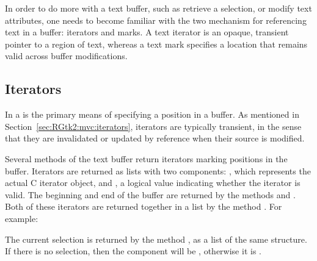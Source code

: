 In order to do more with a text buffer, such as retrieve a selection,
or modify text attributes, one needs to become familiar with the two
mechanism for referencing text in a buffer: iterators and marks.  A
text iterator is an opaque, transient pointer to a region of text,
whereas a text mark specifies a location that remains valid across
buffer modifications.

\subsection{Iterators}


In \GTK{} a  is the primary means of specifying a
position in a buffer.  As mentioned in
Section~\ref{sec:RGtk2:mvc:iterators}, iterators are typically
transient, in the sense that they are invalidated or updated by
reference when their source is modified.

Several methods of the text buffer return iterators marking positions
in the buffer.  Iterators are returned as lists with two components:
, which represents the actual C iterator object, and
, a logical value indicating whether the iterator is
valid.  The beginning and end of the buffer are returned by the
methods  and
. Both of these iterators are
returned together in a list by the method
.  For example:
\begin{Schunk}
\end{Schunk}
%
The current selection is returned by the method
, as a list of the same
structure. If there is no selection, then the component 
will be , otherwise it is .

